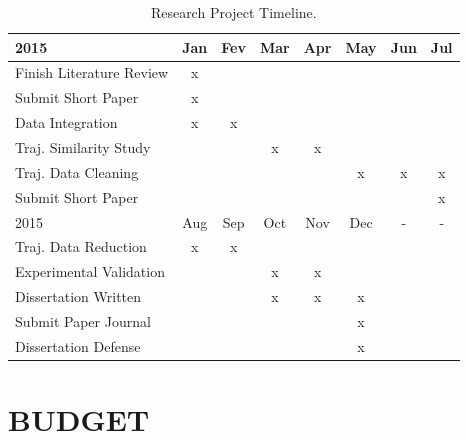 \documentclass[a4paper,12pt]{article}
\begin{document}
\begin{table}[htbp]
\centering
\label{tab:timeline}
\begin{tabular}{l|c|c|c|c|c|c|c|}
\toprule
2015 & Jan & Fev & Mar & Apr & May & Jun & Jul \\
\midrule
Finish Literature Review & x & & & & & & \\
\midrule
Submit Short Paper & x & & & & & & \\
\midrule
Data Integration & x & x & & & & & \\
\midrule
Traj. Similarity Study & & & x & x & & & \\
\midrule
Traj. Data Cleaning & & & & & x & x & x \\
\midrule
Submit Short Paper & & & & & & & x \\
\midrule
\midrule
2015 & Aug & Sep & Oct & Nov & Dec & - & - \\
\midrule
Traj. Data Reduction & x & x & & & & & \\
\midrule
Experimental Validation & & & x & x & & & \\
\midrule
Dissertation Written & & & x & x & x & & \\
\midrule
Submit Paper Journal & & & & & x & & \\
\midrule
Dissertation Defense & & & & & x & & \\
\bottomrule
\end{tabular}
\caption{Research Project Timeline.}
\end{table}

\section{BUDGET}\label{sec:budget}
\end{document}
